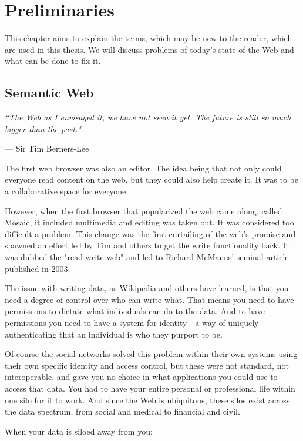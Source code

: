 \setlength{\epigraphwidth}{.5\textwidth}
\setlength\epigraphrule{0pt}

\chapter{Preliminaries}
This chapter aims to explain the terms, which may be new to the reader, which are used in this thesis.
We will discuss problems of today's state of the Web and what can be done to fix it.

\section{Semantic Web}
\epigraph{\textit{``The Web as I envisaged it, we have not seen it yet. The future is still so much bigger than the past."}}{--- Sir Tim Berners-Lee}

The first web browser was also an editor. The idea being that not only could everyone read content on the web, but they could also help create it. It was to be a collaborative space for everyone.

However, when the first browser that popularized the web came along, called Mosaic, it included multimedia and editing was taken out. It was considered too difficult a problem. This change was the first curtailing of the web's promise and spawned an effort led by Tim and others to get the write functionality back. It was dubbed the "read-write web" and led to Richard McManus' seminal article published in 2003.

The issue with writing data, as Wikipedia and others have learned, is that you need a degree of control over who can write what. That means you need to have permissions to dictate what individuals can do to the data. And to have permissions you need to have a system for identity - a way of uniquely authenticating that an individual is who they purport to be.

Of course the social networks solved this problem within their own systems using their own specific identity and access control, but these were not standard, not interoperable, and gave you no choice in what applications you could use to access that data. You had to have your entire personal or professional life within one silo for it to work. And since the Web is ubiquitous, these silos exist across the data spectrum, from social and medical to financial and civil.

When your data is siloed away from you:

